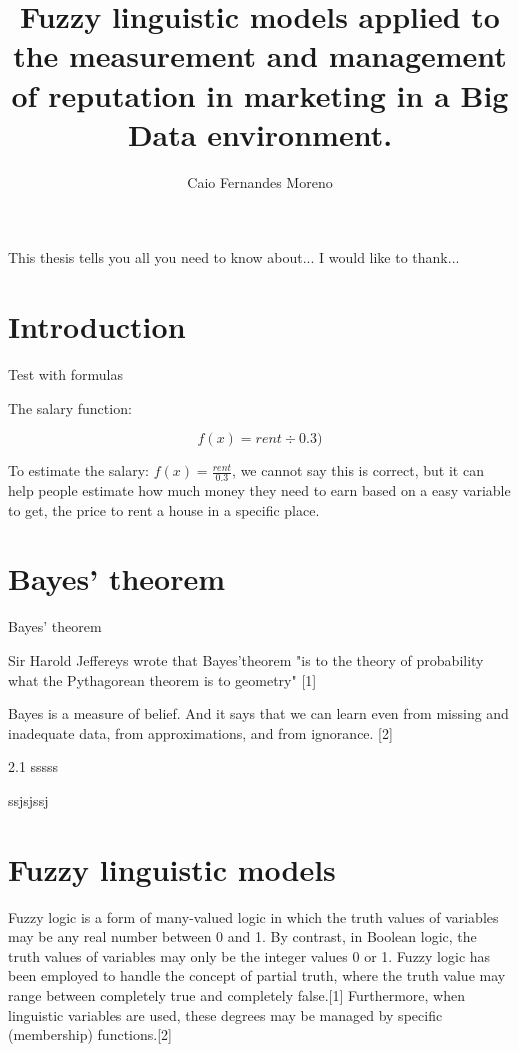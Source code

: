 \documentclass{report}
\begin{document}

\title{Fuzzy linguistic models applied to the measurement and management of reputation in marketing in a Big Data environment.}
\author{Caio Fernandes Moreno}

\beforepreface
{}
This thesis tells you all you need to know about...
I would like to thank...
\afterpreface

\chapter{Introduction}


Test with formulas


The salary function:

 \begin{equation}
 f(x)  = rent \div 0.3 )
 \end{equation}
 
 
To estimate the salary: \(f(x) = \displaystyle \frac{rent}{0.3}\), we cannot say this is correct, but it can help people estimate how much money they need to earn based on a easy variable to get, the price to rent a house in a specific place. 
 


\chapter{Bayes' theorem}


Bayes' theorem


Sir Harold Jeffereys wrote that Bayes'theorem "is to the theory of probability what the Pythagorean theorem is to geometry" [1]

Bayes is a measure of belief. And it says that we can learn even from missing and inadequate data,
from approximations, and from ignorance. [2]

2.1 sssss

ssjsjssj


\chapter{Fuzzy linguistic models}

Fuzzy logic is a form of many-valued logic in which the truth values of variables may be any real number between 0 and 1. By contrast, in Boolean logic, the truth values of variables may only be the integer values 0 or 1. Fuzzy logic has been employed to handle the concept of partial truth, where the truth value may range between completely true and completely false.[1] Furthermore, when linguistic variables are used, these degrees may be managed by specific (membership) functions.[2]
\end{document}
